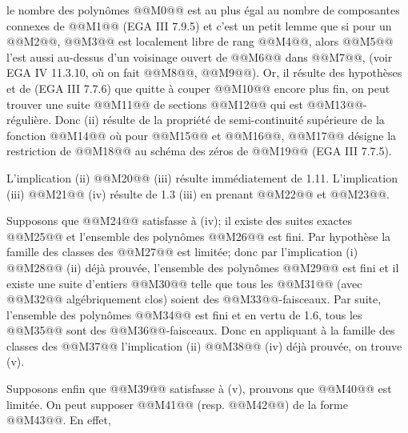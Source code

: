 
le nombre des polynômes @@M0@@ est au plus égal au nombre de composantes connexes de @@M1@@ (EGA III 7.9.5) et c'est un petit lemme que si pour un @@M2@@, @@M3@@ est localement libre de rang @@M4@@, alors @@M5@@ l'est aussi au-dessus d'un voisinage ouvert de @@M6@@ dans @@M7@@, (voir EGA IV 11.3.10, où on fait @@M8@@, @@M9@@). Or, il résulte des hypothèses et de (EGA III 7.7.6) que quitte à couper @@M10@@ encore plus fin, on peut trouver une suite @@M11@@ de sections @@M12@@ qui est @@M13@@-régulière. Donc (ii) résulte de la propriété de semi-continuité supérieure de la fonction @@M14@@ où pour @@M15@@ et @@M16@@, @@M17@@ désigne la restriction de @@M18@@ au schéma des zéros de @@M19@@ (EGA III 7.7.5).

L'implication (ii) @@M20@@ (iii) résulte immédiatement de 1.11. L'implication (iii) @@M21@@ (iv) résulte de 1.3 (iii) en prenant @@M22@@ et @@M23@@.

Supposons que @@M24@@ satisfasse à (iv); il existe des suites exactes
@@M25@@
et l'ensemble des polynômes @@M26@@ est fini. Par hypothèse la famille des classes des @@M27@@ est limitée; donc par l'implication (i) @@M28@@ (ii) déjà prouvée, l'ensemble des polynômes @@M29@@ est fini et il existe une suite d'entiers @@M30@@ telle que tous les @@M31@@ (avec @@M32@@ algébriquement clos) soient des @@M33@@-faisceaux. Par suite, l'ensemble des polynômes @@M34@@ est fini et en vertu de 1.6, tous les @@M35@@ sont des @@M36@@-faisceaux. Donc en appliquant à la famille des classes des @@M37@@ l'implication (ii) @@M38@@ (iv) déjà prouvée, on trouve (v).

Supposons enfin que @@M39@@ satisfasse à (v), prouvons que @@M40@@ est limitée. On peut supposer @@M41@@ (resp. @@M42@@) de la forme @@M43@@. En effet,
